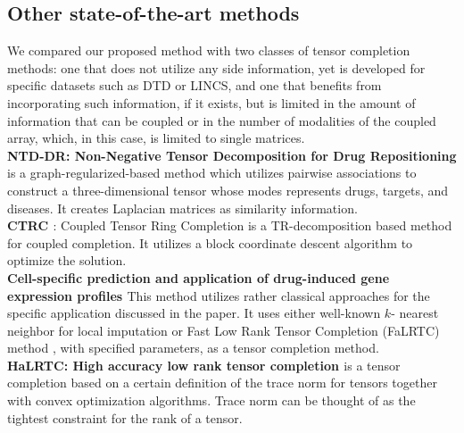 \documentclass{article}
\begin{document}
\subsection{Other state-of-the-art methods}
We compared our proposed method with two classes of tensor completion methods: one that does not utilize any side information, yet is developed for specific datasets such as DTD or LINCS, and one that benefits from incorporating such information, if it exists, but is limited in the amount of information that can be coupled or in the number of modalities of the coupled array, which, in this case, is limited to single matrices.\\
\noindent\textbf{NTD-DR: Non-Negative Tensor Decomposition for Drug Repositioning \cite{jamali2022ntd}} is a graph-regularized-based method which utilizes pairwise associations to construct a three-dimensional tensor whose modes represents  drugs, targets, and diseases. It creates Laplacian matrices as similarity information.\\
\noindent\textbf{{CTRC} \cite{huang2020unified}}: Coupled Tensor Ring Completion is a TR-decomposition based method for coupled completion. It utilizes a block coordinate descent algorithm to optimize the solution.   \\
\noindent\textbf{Cell-specific prediction and application of drug-induced gene expression profiles  \cite{hodos2018cell}}
This method utilizes rather classical approaches for the specific application discussed in the paper. It uses either well-known $k$- nearest neighbor for local imputation or Fast Low Rank Tensor Completion (FaLRTC) method \cite{liu2012tensor}, with specified parameters, as a tensor completion method.\\
\noindent\textbf{HaLRTC: High accuracy low rank tensor completion \cite{liu2012tensor}}
is a tensor completion based on a certain definition of the trace norm for tensors together with convex optimization algorithms. Trace norm can be thought of as the tightest constraint for the rank of a tensor. 
\end{document}
